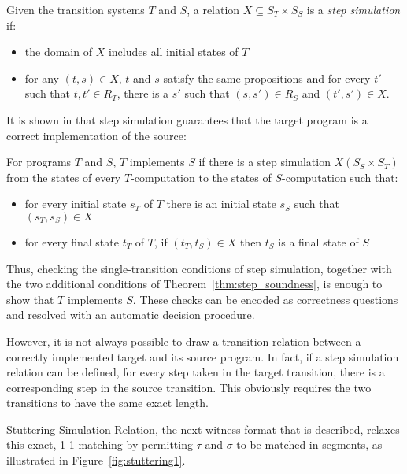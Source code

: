 \begin{fdefinition}
Given the transition systems $T$ and $S$, a relation $X \subseteq S_T \times S_S$ is a \emph{step simulation} if:
\begin{itemize}
  \item the domain of $X$ includes all initial states of $T$
  \item for any $(t,s) \in X$, $t$ and $s$ satisfy the same propositions and for every $t'$ such that $t,t' \in R_T$, there is a $s'$ such that $(s,s') \in R_S$ and $(t',s') \in X$.
\end{itemize}
\end{fdefinition}

It is shown in \cite{zucknamjoshi} that step simulation guarantees that the target program is a correct implementation of the source:

\begin{ftheorem}
\label{thm:step_soundness}
  For programs $T$ and $S$, $T$ implements $S$ if there is a step simulation $X(S_S\times S_T)$ from the states of every $T$-computation to the states of $S$-computation such that:
  \begin{itemize}
    \item for every initial state $s_{T}$ of $T$ there is an initial state $s_{S}$ such that $(s_{T},s_{S}) \in X$
    \item for every final state $t_{T}$ of $T$, if  $(t_{T},t_{S}) \in X$ then $t_{S}$ is a final state of $S$
  \end{itemize}
\end{ftheorem}
Thus, checking the single-transition conditions of step simulation, together with the two additional conditions of Theorem~\ref{thm:step_soundness}, is enough to show that $T$ implements $S$. These checks can be encoded as correctness questions and resolved with an automatic decision procedure.

However, it is not always possible to draw a transition relation between a correctly implemented target and its source program. In fact, if a step simulation relation can be defined, for every step taken in the target transition, there is a corresponding step in the source transition. This obviously requires the two transitions to have the same exact length.

Stuttering Simulation Relation, the next witness format that is described, relaxes this exact, 1-1 matching by permitting $\tau$ and $\sigma$ to be matched in segments, as illustrated in Figure~\ref{fig:stuttering1}.


